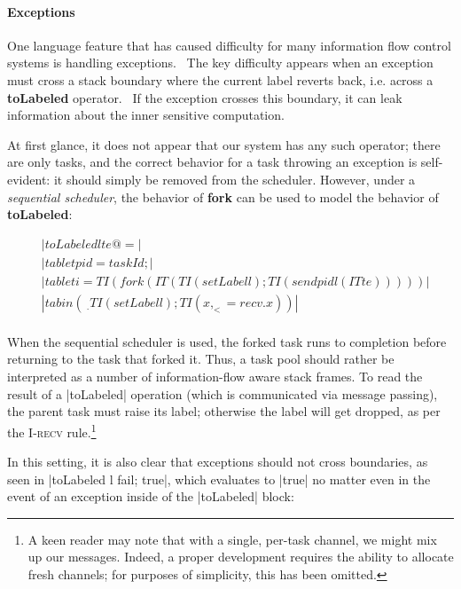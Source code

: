 \paragraph{Exceptions}  One language feature that has caused difficulty
for many information flow control systems is handling
exceptions.~\cite{Hritcu:2013:YIB:2497621.2498098}  The key difficulty
appears when an exception must cross a stack boundary where the current
label reverts back, i.e. across a \textbf{toLabeled} operator.~\cite{lio}
If the exception crosses this boundary, it can leak information about the
inner sensitive computation.

At first glance, it does not appear that our system has any such operator;
there are only tasks, and the correct behavior for a task throwing
an exception is self-evident: it should simply be removed from the scheduler.
However, under a \emph{sequential scheduler}, the behavior of \textbf{fork}
can be used to model the behavior of \textbf{toLabeled}:

\begin{align*}
    & |toLabeled l te @= | \\
    & |tab let pid = taskId; | \\
    & |tab let i = TI (fork (IT (TI (setLabel l); TI (send pid l (IT te)))))| \\
    & |tab in (\ _ . TI (setLabel l); TI ( x, _ <= recv . x ))| \\
\end{align*}

When the sequential scheduler is used, the forked task runs to
completion before returning to the task that forked it.  Thus,
a task pool should rather be interpreted as a number of information-flow
aware stack frames.  To read the result of a |toLabeled| operation
(which is communicated via message passing), the parent task must raise
its label; otherwise the label will get dropped, as per the \textsc{I-recv} rule.\footnote{A keen reader may note that with a single, per-task
channel, we might mix up our messages.  Indeed, a proper development requires
the ability to allocate fresh channels; for purposes of simplicity, this
has been omitted.}

In this setting, it is also clear that exceptions should not cross boundaries,
as seen in |toLabeled l fail; true|, which evaluates to |true| no matter even in
the event of an exception inside of the |toLabeled| block:







